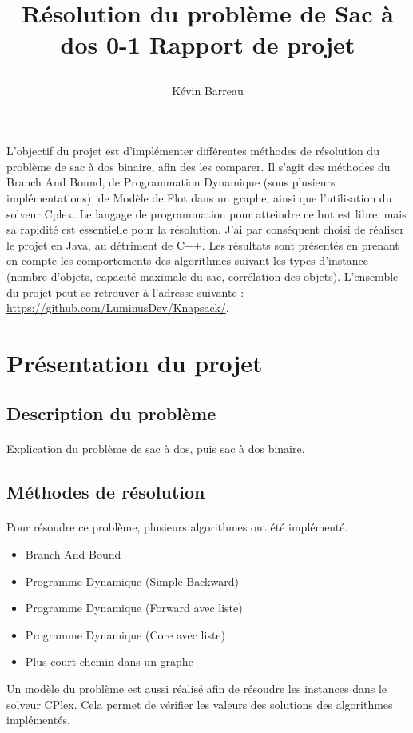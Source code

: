 \documentclass[12pt]{article}
\title{
 \begin{minipage}\linewidth
        \centering
        Résolution du problème de Sac à dos 0-1
        \vskip3pt
        \large Rapport de projet
    \end{minipage}
 }
\author{Kévin Barreau}
\begin{document}
\maketitle

\abstract
L'objectif du projet est d'implémenter différentes méthodes de résolution du problème de sac à dos binaire, afin des les comparer. Il s'agit des méthodes du Branch And Bound, de Programmation Dynamique (sous plusieurs implémentations), de Modèle de Flot dans un graphe, ainsi que l'utilisation du solveur Cplex. Le langage de programmation pour atteindre ce but est libre, mais sa rapidité est essentielle pour la résolution. J'ai par conséquent choisi de réaliser le projet en Java, au détriment de C++. Les résultats sont présentés en prenant en compte les comportements des algorithmes suivant les types d'instance (nombre d'objets, capacité maximale du sac, corrélation des objets). L'ensemble du projet peut se retrouver à l'adresse suivante : \url{https://github.com/LuminusDev/Knapsack/}.

\newpage

\renewcommand{\contentsname}{Sommaire} 
\tableofcontents

\newpage

\section{Présentation du projet}

\subsection{Description du problème}

\paragraph{}Explication du problème de sac à dos, puis sac à dos binaire.

\subsection{Méthodes de résolution}

\paragraph{}Pour résoudre ce problème, plusieurs algorithmes ont été implémenté.
\begin{itemize}
	\item Branch And Bound
	\item Programme Dynamique (Simple Backward)
	\item Programme Dynamique (Forward avec liste)
	\item Programme Dynamique (Core avec liste)
	\item Plus court chemin dans un graphe
\end{itemize}
Un modèle du problème est aussi réalisé afin de résoudre les instances dans le solveur CPlex. Cela permet de vérifier les valeurs des solutions des algorithmes implémentés.
\end{document}
